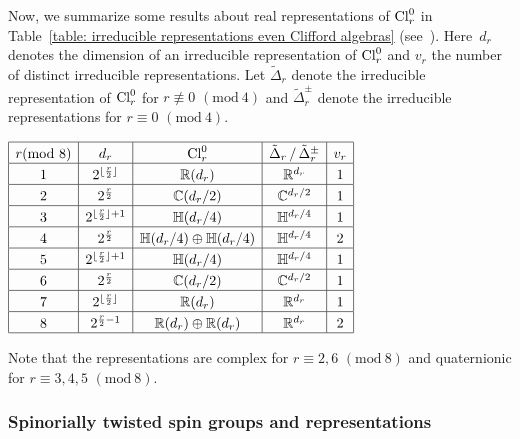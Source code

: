 \documentclass[pdftex]{sigma}
\newcommand\tstrut{\rule{0pt}{2.6ex}}
\numberwithin{equation}{section}
\begin{document}
Now, we summarize some results about real representations of ${\rm Cl}_r^0$ in Table~\ref{table: irreducible representations even Clifford algebras} (see~\cite{Lawson}). Here~$d_r$ denotes the dimension of an irreducible representation of ${\rm Cl}^0_r$ and $v_r$ the number of distinct irreducible representations. Let $\tilde\Delta_r$ denote the irreducible representation of ${\rm Cl}_r^0$ for $r\not\equiv0$ $(\text{mod}~4) $ and $\tilde\Delta^{\pm}_r$ denote the irreducible representations for $r\equiv0$ $(\text{mod}~4)$.
\begin{table}[h!]\centering
$
\begin{array}{|c|c|c|c|c|c|}
\hline
r(\text{mod}~8)&d_r&{\rm Cl}_r^0&\tilde\Delta_r\, / \,\tilde\Delta_r^\pm& v_r \tstrut\\
\hline
1&2^{\lfloor\frac r2\rfloor}&\mathbb R(d_r)&\mathbb{R}^{d_r}&1 \tstrut\\
\hline
2&2^{\frac r2}&\mathbb C(d_r/2)&\mathbb{C}^{d_r/2}&1 \tstrut\\
\hline
3&2^{\lfloor\frac r2\rfloor+1}&\mathbb H(d_r/4)&\mathbb{H}^{d_r/4}&1 \tstrut\\
\hline
4&2^{\frac r2}&\mathbb H(d_r/4)\oplus \mathbb H(d_r/4)&\mathbb{H}^{d_r/4}&2 \tstrut\\
\hline
5&2^{\lfloor\frac r2\rfloor+1}&\mathbb H(d_r/4)&\mathbb{H}^{d_r/4}&1 \tstrut\\
\hline
6&2^{\frac r2}&\mathbb C(d_r/2)&\mathbb{C}^{d_r/2}&1 \tstrut\\
\hline
7&2^{\lfloor\frac r2\rfloor}&\mathbb R(d_r)&\mathbb{R}^{d_r}&1 \tstrut\\
\hline
8&2^{\frac r2-1}&\mathbb R(d_r)\oplus \mathbb R(d_r)&\mathbb{R}^{d_r}&2 \tstrut\\
\hline
\end{array}
$
\caption{Irreducible representations of even Clifford algebras.}\label{table: irreducible representations even Clifford algebras}
\end{table}

Note that
the representations are complex for $r\equiv 2,6$ $(\text{mod}~8)$ and quaternionic for $r\equiv 3,4,5$
$(\text{mod}~8)$.

\subsubsection{Spinorially twisted spin groups and representations}
\end{document}
